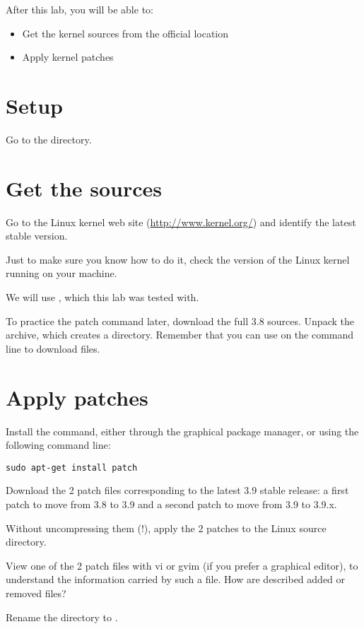 
After this lab, you will be able to:
\begin{itemize}
\item Get the kernel sources from the official location
\item Apply kernel patches
\end{itemize}

\section{Setup}

Go to the  directory.

\section{Get the sources}

Go to the Linux kernel web site (\url{http://www.kernel.org/}) and
identify the latest stable version.

Just to make sure you know how to do it, check the version of the
Linux kernel running on your machine.

We will use , which this lab was tested with.

To practice the patch command later, download the full 3.8
sources. Unpack the archive, which creates a 
directory. Remember that you can use  on the command
line to download files.

\section{Apply patches}

Install the  command, either through the graphical package
manager, or using the following command line:

\begin{verbatim}
sudo apt-get install patch
\end{verbatim}

Download the 2 patch files corresponding to the latest 3.9 stable
release: a first patch to move from 3.8 to 3.9 and a second patch to
move from 3.9 to 3.9.x.

Without uncompressing them (!), apply the 2 patches to the Linux
source directory.

View one of the 2 patch files with vi or gvim (if you prefer a
graphical editor), to understand the information carried by such a
file. How are described added or removed files?

Rename the  directory to .

